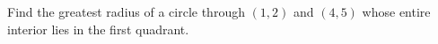 Find the greatest radius of a circle through $(1,2)$ and $(4,5)$ whose entire interior lies in the first quadrant.
